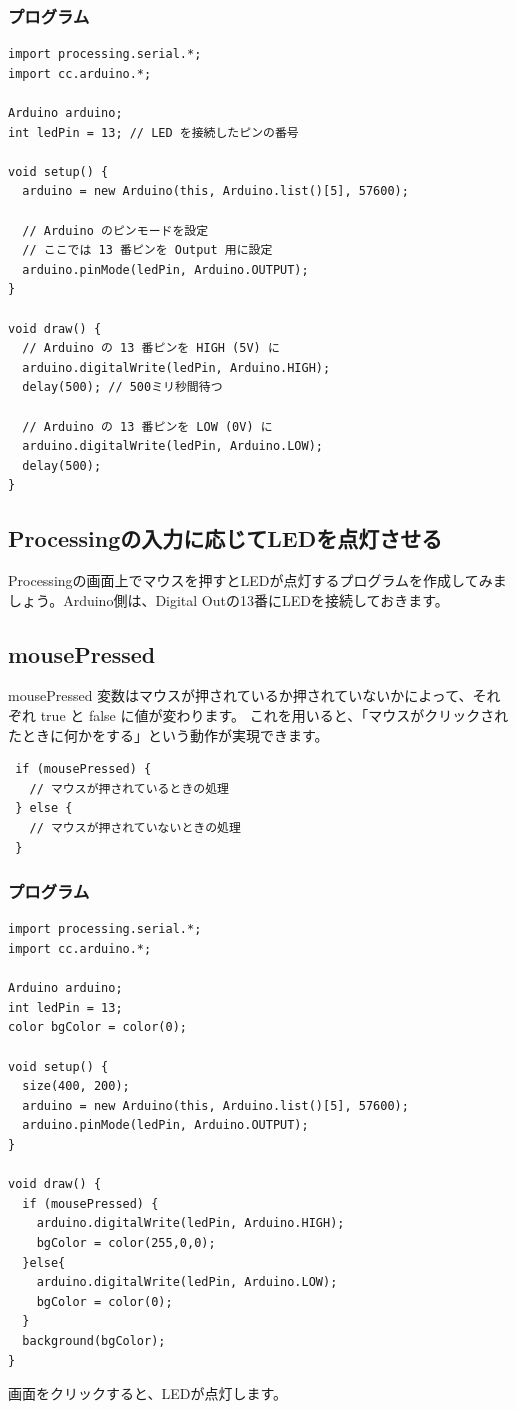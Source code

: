 \documentclass[11pt,a4paper]{jarticle}
\begin{document}
\subsubsection*{プログラム}
\begin{lstlisting}
import processing.serial.*;
import cc.arduino.*;
 
Arduino arduino;
int ledPin = 13; // LED を接続したピンの番号
 
void setup() {
  arduino = new Arduino(this, Arduino.list()[5], 57600);

  // Arduino のピンモードを設定
  // ここでは 13 番ピンを Output 用に設定
  arduino.pinMode(ledPin, Arduino.OUTPUT);
}
 
void draw() {
  // Arduino の 13 番ピンを HIGH (5V) に
  arduino.digitalWrite(ledPin, Arduino.HIGH);
  delay(500); // 500ミリ秒間待つ

  // Arduino の 13 番ピンを LOW (0V) に
  arduino.digitalWrite(ledPin, Arduino.LOW);
  delay(500);
}
\end{lstlisting}

\newpage

\subsection{Processingの入力に応じてLEDを点灯させる}
Processingの画面上でマウスを押すとLEDが点灯するプログラムを作成してみましょう。Arduino側は、Digital Outの13番にLEDを接続しておきます。

\subsection*{mousePressed}
mousePressed 変数はマウスが押されているか押されていないかによって、それぞれ true と false に値が変わります。
これを用いると、「マウスがクリックされたときに何かをする」という動作が実現できます。

\begin{lstlisting}
 if (mousePressed) {
   // マウスが押されているときの処理
 } else {
   // マウスが押されていないときの処理
 }
\end{lstlisting}

\subsubsection*{プログラム}
\begin{lstlisting}
import processing.serial.*;
import cc.arduino.*;
 
Arduino arduino;
int ledPin = 13;
color bgColor = color(0);
 
void setup() {
  size(400, 200);
  arduino = new Arduino(this, Arduino.list()[5], 57600);
  arduino.pinMode(ledPin, Arduino.OUTPUT);
}
 
void draw() {
  if (mousePressed) {
    arduino.digitalWrite(ledPin, Arduino.HIGH);
    bgColor = color(255,0,0);
  }else{
    arduino.digitalWrite(ledPin, Arduino.LOW);
    bgColor = color(0);
  }
  background(bgColor);
}
\end{lstlisting}
画面をクリックすると、LEDが点灯します。
\end{document}
